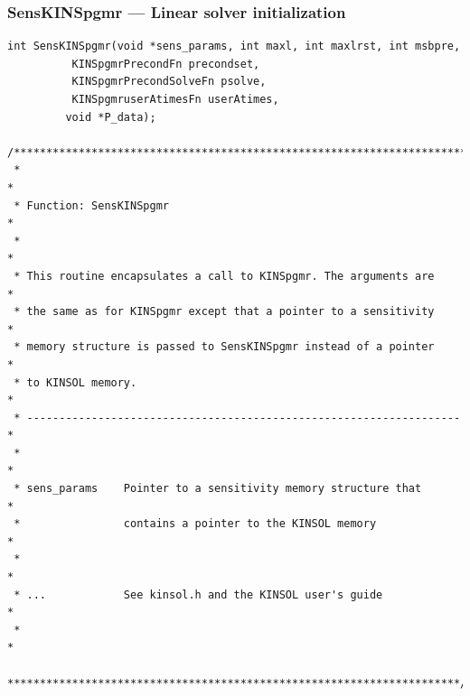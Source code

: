 \documentclass[11pt]{article}
\begin{document}
\normalsize

\subsubsection{SensKINSpgmr --- Linear solver initialization}
\label{subsubsec:DescSensKINSpgmr}
\small
\begin{verbatim}
int SensKINSpgmr(void *sens_params, int maxl, int maxlrst, int msbpre,
	      KINSpgmrPrecondFn precondset,
	      KINSpgmrPrecondSolveFn psolve,
	      KINSpgmruserAtimesFn userAtimes,
         void *P_data);

/**********************************************************************
 *                                                                    *
 * Function: SensKINSpgmr                                             *
 *                                                                    *
 * This routine encapsulates a call to KINSpgmr. The arguments are    *
 * the same as for KINSpgmr except that a pointer to a sensitivity    *
 * memory structure is passed to SensKINSpgmr instead of a pointer    *
 * to KINSOL memory.                                                  *
 * -------------------------------------------------------------------*
 *                                                                    *
 * sens_params    Pointer to a sensitivity memory structure that      *
 *                contains a pointer to the KINSOL memory             *
 *                                                                    *
 * ...            See kinsol.h and the KINSOL user's guide            *
 *                                                                    *
 **********************************************************************/
\end{verbatim}
\normalsize
\end{document}
